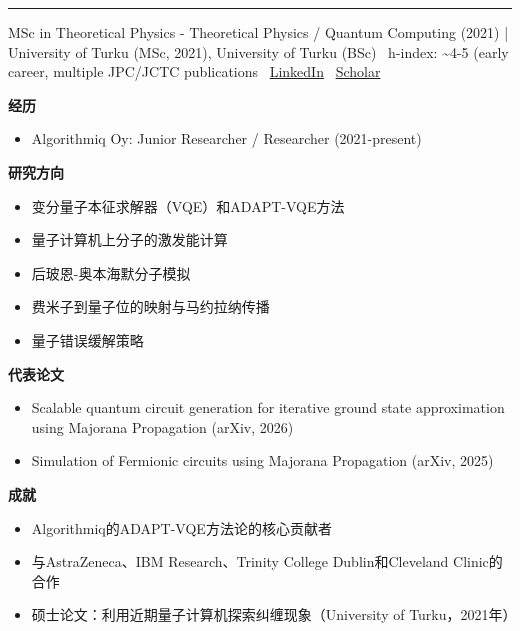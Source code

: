 \vspace{2pt}\hrule\vspace{2pt}
\vspace{4pt}
\par{\footnotesize\color{graytext}MSc in Theoretical Physics - Theoretical Physics / Quantum Computing (2021) | University of Turku (MSc, 2021), University of Turku (BSc) \textbar\  h-index: \textasciitilde{}4-5 (early career, multiple JPC/JCTC publications \textbar\  \href{https://www.linkedin.com/in/anton-nykänen-6b434a203/}{LinkedIn} \textbar\  \href{https://orcid.org/0009-0003-1949-3028}{Scholar}}
\par{\footnotesize\color{mainred}\textbf{经历}}
\begin{itemize}[leftmargin=1.2em,itemsep=0pt,topsep=0pt]
\item {\footnotesize Algorithmiq Oy: Junior Researcher / Researcher (2021-present)}
\end{itemize}
\par{\footnotesize\color{mainred}\textbf{研究方向}}
\begin{itemize}[leftmargin=1.2em,itemsep=0pt,topsep=0pt]
\item {\footnotesize 变分量子本征求解器（VQE）和ADAPT-VQE方法}
\item {\footnotesize 量子计算机上分子的激发能计算}
\item {\footnotesize 后玻恩-奥本海默分子模拟}
\item {\footnotesize 费米子到量子位的映射与马约拉纳传播}
\item {\footnotesize 量子错误缓解策略}
\end{itemize}
\par{\footnotesize\color{mainred}\textbf{代表论文}}
\begin{itemize}[leftmargin=1.2em,itemsep=0pt,topsep=0pt]
\item {\footnotesize Scalable quantum circuit generation for iterative ground state approximation using Majorana Propagation (arXiv, 2026)}
\item {\footnotesize Simulation of Fermionic circuits using Majorana Propagation (arXiv, 2025)}
\end{itemize}
\par{\footnotesize\color{mainred}\textbf{成就}}
\begin{itemize}[leftmargin=1.2em,itemsep=0pt,topsep=0pt]
\item {\footnotesize Algorithmiq的ADAPT-VQE方法论的核心贡献者}
\item {\footnotesize 与AstraZeneca、IBM Research、Trinity College Dublin和Cleveland Clinic的合作}
\item {\footnotesize 硕士论文：利用近期量子计算机探索纠缠现象（University of Turku，2021年）}
\end{itemize}
